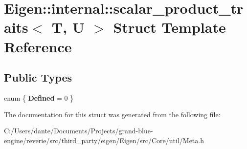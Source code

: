 \hypertarget{struct_eigen_1_1internal_1_1scalar__product__traits}{}\section{Eigen\+::internal\+::scalar\+\_\+product\+\_\+traits$<$ T, U $>$ Struct Template Reference}
\label{struct_eigen_1_1internal_1_1scalar__product__traits}
\subsection*{Public Types}
\begin{DoxyCompactItemize}
\item 
\mbox{\label{struct_eigen_1_1internal_1_1scalar__product__traits_a00ccd8c2663c1ce2692f8b35976bf4f7}} 
enum \{ {\bfseries Defined} = 0
 \}
\end{DoxyCompactItemize}


The documentation for this struct was generated from the following file\+:\begin{DoxyCompactItemize}
\item 
C\+:/\+Users/dante/\+Documents/\+Projects/grand-\/blue-\/engine/reverie/src/third\+\_\+party/eigen/\+Eigen/src/\+Core/util/Meta.\+h\end{DoxyCompactItemize}
